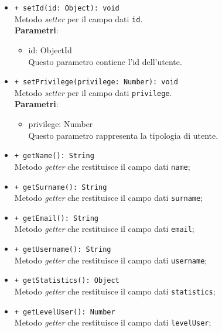 \begin{itemize}
\begin{itemize}
				\item \texttt{+ setId(id: Object): void} \\
				Metodo \textit{setter} per il campo dati \texttt{id}.\\
				\textbf{Parametri}:
				\begin{itemize}
					\item {id: ObjectId}\\
					Questo parametro contiene l'id dell'utente.
				\end{itemize}
				
				\item \texttt{+ setPrivilege(privilege: Number): void} \\
				Metodo \textit{setter} per il campo dati \texttt{privilege}.\\
				\textbf{Parametri}:
				\begin{itemize}
					\item {privilege: Number}\\
					Questo parametro rappresenta la tipologia di utente.
				\end{itemize}
				
				\item \texttt{+ getName(): String} \\
				Metodo \textit{getter} che restituisce il campo dati \texttt{name};
				
				\item \texttt{+ getSurname(): String} \\
				Metodo \textit{getter} che restituisce il campo dati \texttt{surname};
				
				\item \texttt{+ getEmail(): String} \\
				Metodo \textit{getter} che restituisce il campo dati \texttt{email};
				
				\item \texttt{+ getUsername(): String} \\
				Metodo \textit{getter} che restituisce il campo dati \texttt{username};
				
				\item \texttt{+ getStatistics(): Object} \\
				Metodo \textit{getter} che restituisce il campo dati \texttt{statistics};
				
				\item \texttt{+ getLevelUser(): Number} \\
				Metodo \textit{getter} che restituisce il campo dati \texttt{levelUser};
				

\end{itemize}
\end{itemize}
